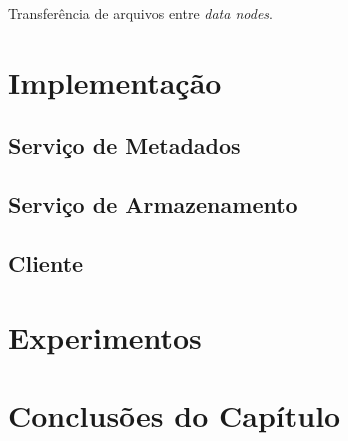 	Transferência de arquivos entre \textit{data nodes}.
	
	
	\section{Implementação}
	
	\subsection{Serviço de Metadados}
	
	\subsection{Serviço de Armazenamento}
	
	\subsection{Cliente}
	
	
	\section{Experimentos}
	
	\section{Conclusões do Capítulo}
	
	
	